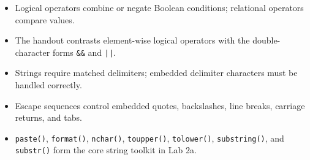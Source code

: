 \begin{chapterrecap}
\begin{itemize}
  \item Logical operators combine or negate Boolean conditions; relational operators compare values.
  \item The handout contrasts element-wise logical operators with the double-character forms \texttt{\&\&} and \texttt{||}.
  \item Strings require matched delimiters; embedded delimiter characters must be handled correctly.
  \item Escape sequences control embedded quotes, backslashes, line breaks, carriage returns, and tabs.
  \item \texttt{paste()}, \texttt{format()}, \texttt{nchar()}, \texttt{toupper()}, \texttt{tolower()}, \texttt{substring()}, and \texttt{substr()} form the core string toolkit in Lab 2a.
\end{itemize}
\end{chapterrecap}
